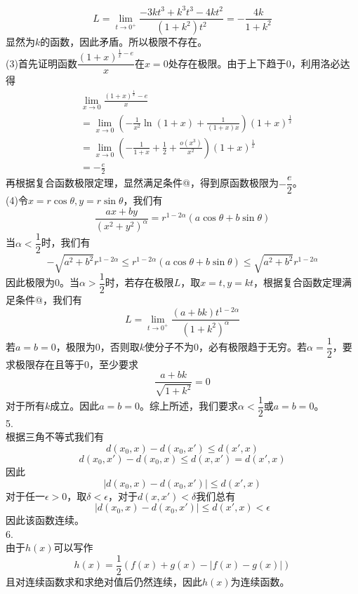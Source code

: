 \documentclass[utf8]{ctexart}
\makeatletter
\newcommand{\Rmnum}[1]{\expandafter\@slowromancap\romannumeral #1@}
\makeatother
\begin{document}
\[L=\lim_{t\rightarrow0^+}\frac{-3kt^3+k^3t^3-4kt^2}{(1+k^2)t^2}=-\frac{4k}{1+k^2}\]
显然为$k$的函数，因此矛盾。所以极限不存在。\\
(3)首先证明函数$\dfrac{(1+x)^{\frac{1}{x}-e}}{x}$在$x=0$处存在极限。由于上下趋于$0$，利用洛必达得
\begin{align*}
	&\lim_{x\rightarrow0}\frac{(1+x)^\frac{1}{x}-e}{x}\\
	&=\lim_{x\rightarrow0}\left(-\frac{1}{x^2}\ln(1+x)+\frac{1}{(1+x)x}\right)(1+x)^\frac{1}{x}\\
	&=\lim_{x\rightarrow0}\left(-\frac{1}{1+x}+\frac{1}{2}+\frac{o(x^3)}{x^2}\right)(1+x)^\frac{1}{x}\\
	&=-\frac{e}{2}
\end{align*}
再根据复合函数极限定理，显然满足条件\Rmnum{1}，得到原函数极限为$-\dfrac{e}{2}$。\\
(4)令$x=r\cos\theta,y=r\sin\theta$，我们有
\[\frac{ax+by}{(x^2+y^2)^\alpha}=r^{1-2\alpha}(a\cos\theta+b\sin\theta)\]
当$\alpha<\dfrac{1}{2}$时，我们有
\[-\sqrt{a^2+b^2}r^{1-2\alpha}\le r^{1-2\alpha}(a\cos\theta+b\sin\theta)\le\sqrt{a^2+b^2}r^{1-2\alpha}\]
因此极限为$0$。当$\alpha>\dfrac{1}{2}$时，若存在极限$L$，取$x=t,y=kt$，根据复合函数定理满足条件\Rmnum{1}，我们有
\[L=\lim_{t\rightarrow0^+}\frac{(a+bk)t^{1-2\alpha}}{(1+k^2)^\alpha}\]
若$a=b=0$，极限为$0$，否则取$k$使分子不为$0$，必有极限趋于无穷。若$\alpha=\dfrac{1}{2}$，要求极限存在且等于$0$，至少要求
\[\frac{a+bk}{\sqrt{1+k^2}}=0\]
对于所有$k$成立。因此$a=b=0$。综上所述，我们要求$\alpha<\dfrac{1}{2}$或$a=b=0$。\\
5.\\
根据三角不等式我们有
\[d(x_0,x)-d(x_0,x')\le d(x',x)\]
\[d(x_0,x')-d(x_0,x)\le d(x,x')=d(x',x)\]
因此
\[|d(x_0,x)-d(x_0,x')|\le d(x',x)\]
对于任一$\epsilon>0$，取$\delta<\epsilon$，对于$d(x,x')<\delta$我们总有
\[|d(x_0,x)-d(x_0,x')|\le d(x',x)<\epsilon\]
因此该函数连续。\\
6.\\
由于$h(x)$可以写作
\[h(x)=\frac{1}{2}(f(x)+g(x)-|f(x)-g(x)|)\]
且对连续函数求和求绝对值后仍然连续，因此$h(x)$为连续函数。
\end{document}
